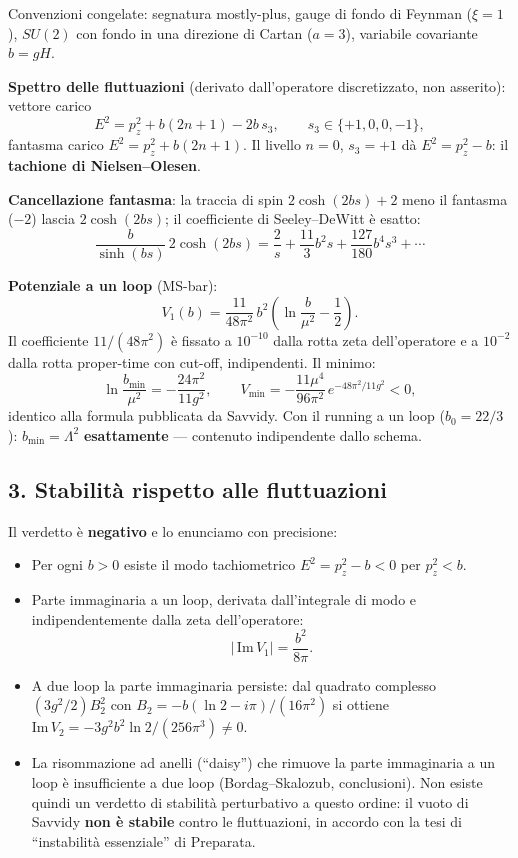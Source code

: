 \documentclass[
]{article}
\providecommand{\tightlist}{%
  \setlength{\itemsep}{0pt}\setlength{\parskip}{0pt}}
\begin{document}
Convenzioni congelate: segnatura mostly-plus, gauge di fondo di Feynman
(\(\xi = 1\)), \(SU(2)\) con fondo in una direzione di Cartan
(\(a = 3\)), variabile covariante \(b = gH\).

\textbf{Spettro delle fluttuazioni} (derivato dall'operatore
discretizzato, non asserito): vettore carico
\[E^2 = p_z^2 + b(2n+1) - 2b\,s_3, \qquad s_3 \in \{+1, 0, 0, -1\},\]
fantasma carico \(E^2 = p_z^2 + b(2n+1)\). Il livello \(n=0\),
\(s_3 = +1\) dà \(E^2 = p_z^2 - b\): il \textbf{tachione di
Nielsen--Olesen}.

\textbf{Cancellazione fantasma}: la traccia di spin \(2\cosh(2bs) + 2\)
meno il fantasma (\(-2\)) lascia \(2\cosh(2bs)\); il coefficiente di
Seeley--DeWitt è esatto:
\[\frac{b}{\sinh(bs)}\,2\cosh(2bs) = \frac{2}{s} + \frac{11}{3}b^2 s + \frac{127}{180}b^4 s^3 + \cdots\]

\textbf{Potenziale a un loop} (MS-bar):
\[V_1(b) = \frac{11}{48\pi^2}\,b^2\left(\ln\frac{b}{\mu^2} - \frac{1}{2}\right).\]
Il coefficiente \(11/(48\pi^2)\) è fissato a \(10^{-10}\) dalla rotta
zeta dell'operatore e a \(10^{-2}\) dalla rotta proper-time con cut-off,
indipendenti. Il minimo:
\[\ln\frac{b_{\min}}{\mu^2} = -\frac{24\pi^2}{11 g^2}, \qquad V_{\min} = -\frac{11\mu^4}{96\pi^2}\,e^{-48\pi^2/11g^2} < 0,\]
identico alla formula pubblicata da Savvidy. Con il running a un loop
(\(b_0 = 22/3\)): \(b_{\min} = \Lambda^2\) \textbf{esattamente} ---
contenuto indipendente dallo schema.

\hypertarget{stabilituxe0-rispetto-alle-fluttuazioni}{%
\subsection{3. Stabilità rispetto alle
fluttuazioni}\label{stabilituxe0-rispetto-alle-fluttuazioni}}

Il verdetto è \textbf{negativo} e lo enunciamo con precisione:

\begin{itemize}
\tightlist
\item
  Per ogni \(b > 0\) esiste il modo tachiometrico
  \(E^2 = p_z^2 - b < 0\) per \(p_z^2 < b\).
\item
  Parte immaginaria a un loop, derivata dall'integrale di modo e
  indipendentemente dalla zeta dell'operatore:
  \[|\,\mathrm{Im}\,V_1| = \frac{b^2}{8\pi}.\]
\item
  A due loop la parte immaginaria persiste: dal quadrato complesso
  \((3g^2/2)B_2^2\) con \(B_2 = -b(\ln 2 - i\pi)/(16\pi^2)\) si ottiene
  \(\mathrm{Im}\,V_2 = -3g^2 b^2 \ln 2/(256\pi^3) \neq 0\).
\item
  La risommazione ad anelli (``daisy'') che rimuove la parte immaginaria
  a un loop è insufficiente a due loop (Bordag--Skalozub, conclusioni).
  Non esiste quindi un verdetto di stabilità perturbativo a questo
  ordine: il vuoto di Savvidy \textbf{non è stabile} contro le
  fluttuazioni, in accordo con la tesi di ``instabilità essenziale'' di
  Preparata.
\end{itemize}
\end{document}
